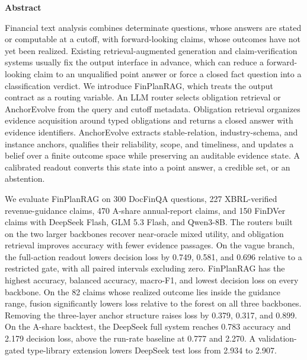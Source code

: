 \documentclass[12pt,openany]{ctexbook}
\begin{document}
\clearpage
{}
{}
\begin{center}{\arial\bfseries{} Abstract\par}\end{center}
\vspace{0.6cm}
{\arial{}\selectfont\sloppy
\setlength{\parindent}{0pt}
\setlength{\emergencystretch}{3em}
\hspace*{2em}Financial text analysis combines determinate questions, whose answers are stated or computable at a cutoff, with forward-looking claims, whose outcomes have not yet been realized. Existing retrieval-augmented generation and claim-verification systems usually fix the output interface in advance, which can reduce a forward-looking claim to an unqualified point answer or force a closed fact question into a classification verdict. We introduce FinPlanRAG, which treats the output contract as a routing variable. An LLM router selects obligation retrieval or AnchorEvolve from the query and cutoff metadata. Obligation retrieval organizes evidence acquisition around typed obligations and returns a closed answer with evidence identifiers. AnchorEvolve extracts stable-relation, industry-schema, and instance anchors, qualifies their reliability, scope, and timeliness, and updates a belief over a finite outcome space while preserving an auditable evidence state. A calibrated readout converts this state into a point answer, a credible set, or an abstention.\par
\hspace*{2em}We evaluate FinPlanRAG on 300 DocFinQA questions, 227 XBRL-verified revenue-guidance claims, 470 A-share annual-report claims, and 150 FinDVer claims with DeepSeek Flash, GLM 5.3 Flash, and Qwen3-8B. The routers built on the two larger backbones recover near-oracle mixed utility, and obligation retrieval improves accuracy with fewer evidence passages. On the vague branch, the full-action readout lowers decision loss by 0.749, 0.581, and 0.696 relative to a restricted gate, with all paired intervals excluding zero. FinPlanRAG has the highest accuracy, balanced accuracy, macro-F1, and lowest decision loss on every backbone. On the 82 claims whose realized outcome lies inside the guidance range, fusion significantly lowers loss relative to the forest on all three backbones. Removing the three-layer anchor structure raises loss by 0.379, 0.317, and 0.899. On the A-share backtest, the DeepSeek full system reaches 0.783 accuracy and 2.179 decision loss, above the run-rate baseline at 0.777 and 2.270. A validation-gated type-library extension lowers DeepSeek test loss from 2.934 to 2.907.\par
}
\end{document}

